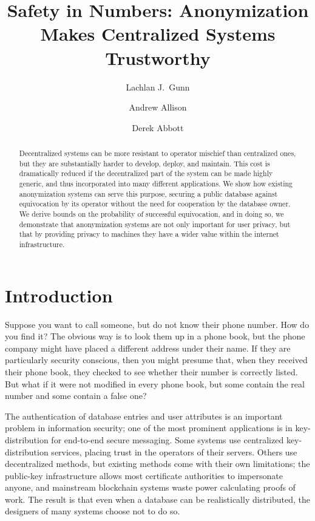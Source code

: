 \documentclass[USenglish]{llncs}
\begin{document}
\title{Safety in Numbers: Anonymization Makes Centralized Systems Trustworthy}

\author{Lachlan J.~Gunn \and Andrew Allison \and Derek Abbott}

\maketitle

\begin{abstract}{Decentralized systems can be more resistant to
operator mischief than centralized ones, but they are substantially harder to
develop, deploy, and maintain.  This cost is dramatically reduced if the
decentralized part of the system can be made highly generic, and thus
incorporated into many different applications.  We show how existing anonymization
systems can serve this purpose, securing a public database against
equivocation by its operator without the need for cooperation by the
database owner.  We derive bounds on the probability of successful
equivocation, and in doing so, we demonstrate
that anonymization systems are not only important
for user privacy, but that by providing privacy to machines
they have a wider value within the internet infrastructure.
}\end{abstract}

\section{Introduction}
Suppose you want to call someone, but do not
know their phone number.  How do you find it?  The obvious way is to look them up
in a phone book, but the phone company might have placed a different
address under their name.  If they are particularly security conscious, then
you might presume that, when they received their phone book, they checked
to see whether their number is correctly listed.  But what if it were not modified
in every phone book, but some contain the real number and some contain
a false one?

The authentication of database entries and user attributes is an important problem
in information security; one of the most prominent applications is in key-distribution for
end-to-end secure messaging.  Some systems use centralized key-distribution services,
placing trust in the operators of their servers.  Others use decentralized methods,
but existing methods come with their own limitations; the public-key infrastructure
allows most certificate authorities to impersonate anyone, and mainstream blockchain
systems waste power calculating proofs of work.
The result is that even when a database can be realistically distributed, the designers
of many systems choose not to do so.
\end{document}
